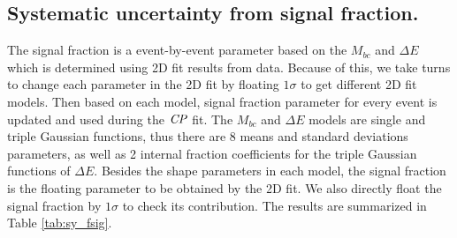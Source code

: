 \subsection{Systematic uncertainty from signal fraction.}
The signal fraction is a event-by-event parameter based on the $M_{bc}$ and $\Delta E$ which is determined using 2D fit results from data. Because of this, we take turns to change each parameter in the 2D fit by floating $1\sigma$ to get different 2D fit models. Then based on each model, signal fraction parameter for every event is updated and used during the $\it{CP}$ fit. The $M_{bc}$ and $\Delta E$ models are single and triple Gaussian functions, thus there are 8 means and standard deviations parameters, as well as 2 internal fraction coefficients for the triple Gaussian functions of $\Delta E$. Besides the shape parameters in each model, the signal fraction is the floating parameter to be obtained by the 2D fit. We also directly float the signal fraction by $1\sigma$ to check its contribution. 
The results are summarized in Table \ref{tab:sy_fsig}.
